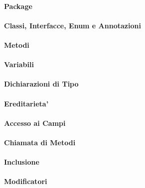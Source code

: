 \paragraph{Package}

\paragraph{Classi, Interfacce, Enum e Annotazioni}

\paragraph{Metodi}

\paragraph{Variabili}

\paragraph{Dichiarazioni di Tipo}

\paragraph{Ereditarieta'}

\paragraph{Accesso ai Campi}

\paragraph{Chiamata di Metodi}

\paragraph{Inclusione}

\paragraph{Modificatori}
